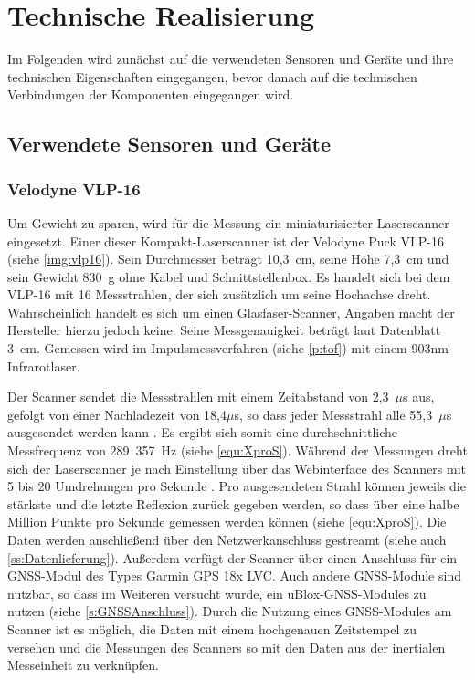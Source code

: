 \documentclass[a4paper,12pt,bibliography=totoc, listof=totoc,titlepage,pointlessnumbers]{scrreprt}
\begin{document}
\chapter{Technische Realisierung}
\label{c:realisierung}


Im Folgenden wird zunächst auf die verwendeten Sensoren und Geräte und ihre technischen Eigenschaften eingegangen, bevor danach auf die technischen Verbindungen der Komponenten eingegangen wird.

\section {Verwendete Sensoren und Geräte}

\subsection{Velodyne VLP-16}
\label{sss:vlp16}
Um Gewicht zu sparen, wird für die Messung ein miniaturisierter Laser\-scan\-ner eingesetzt. Einer dieser Kompakt-Laser\-scan\-ner ist der Velodyne Puck VLP-16 (siehe \autoref{img:vlp16}). Sein Durchmesser beträgt 10,3~cm, seine Höhe 7,3~cm  und sein Gewicht 830~g ohne Kabel und Schnittstellenbox. Es handelt sich bei dem VLP-16 mit 16 Messstrahlen, der sich zusätzlich um seine Hochachse dreht. Wahrscheinlich handelt es sich um einen Glasfaser-Scanner, Angaben macht der Hersteller hierzu jedoch keine. Seine Messgenauigkeit beträgt laut Datenblatt 3~cm. Gemessen wird im Impulsmessverfahren (siehe \autoref{p:tof}) mit einem 903nm-Infrarotlaser. \citep{vlpSheet}

Der Scanner sendet die Messstrahlen mit einem Zeitabstand von 2,3~$\mu$s aus, gefolgt von einer Nachladezeit von 18,4$\mu$s, so dass jeder Messstrahl alle 55,3~$\mu$s ausgesendet werden kann \citep[S. 16]{vlpManual}. Es ergibt sich somit eine durchschnittliche Messfrequenz von 289~357~Hz (siehe \autoref{equ:XproS}). Während der Messungen dreht sich der Laser\-scan\-ner je nach Einstellung über das Webinterface des Scanners mit 5 bis 20 Umdrehungen pro Sekunde \citep{vlpSheet}. Pro ausgesendeten Strahl können jeweils die stärkste und die letzte Reflexion zurück gegeben werden, so dass über eine halbe Million Punkte pro Sekunde gemessen werden können (siehe \autoref{equ:XproS}). Die Daten werden anschließend über den Netzwerkanschluss gestreamt (siehe auch \autoref{ss:Datenlieferung}). Außerdem verfügt der Scanner über einen Anschluss für ein GNSS-Modul des Types Garmin GPS 18x LVC. Auch andere GNSS-Module sind nutzbar, so dass im Weiteren versucht wurde, ein uBlox-GNSS-Modules zu nutzen (siehe \autoref{s:GNSSAnschluss}). Durch die Nutzung eines GNSS-Modules am Scanner ist es möglich, die Daten mit einem hochgenauen Zeitstempel zu versehen und die Messungen des Scanners so mit den Daten aus der inertialen Messeinheit zu verknüpfen.
\end{document}
